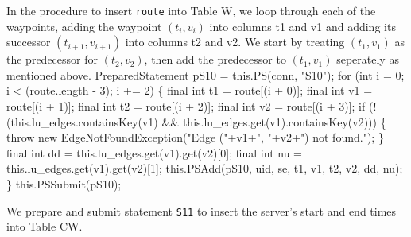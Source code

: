 \documentclass{article}
\def\nwendcode{\endtrivlist \endgroup}      %
\let\nwdocspar=\par
\theoremstyle{definition}                   %
\begin{document}
\nwendcode{}\nwdocspar
{\small In the procedure to insert {\tt{}route} into Table W, we loop through each
of the waypoints, adding the waypoint $(t_i,v_i)$ into columns \textsf{t1} and
\textsf{v1} and adding its successor $(t_{i+1},v_{i+1})$ into columns
\textsf{t2} and \textsf{v2}. We start by treating $(t_1,v_1)$ as the
predecessor for $(t_2,v_2)$, then add the predecessor to $(t_1,v_1)$ seperately
as mentioned above.}
\nwenddocs{}\endmoddef{}
PreparedStatement pS10 = this.PS(conn, "S10");
for (int i = 0; i < (route.length - 3); i += 2) \{
  final int t1 = route[(i + 0)];
  final int v1 = route[(i + 1)];
  final int t2 = route[(i + 2)];
  final int v2 = route[(i + 3)];
  if (!(this.lu_edges.containsKey(v1) && this.lu_edges.get(v1).containsKey(v2))) \{
    throw new EdgeNotFoundException("Edge ("+v1+", "+v2+") not found.");
  \}
  final int dd = this.lu_edges.get(v1).get(v2)[0];
  final int nu = this.lu_edges.get(v1).get(v2)[1];
  this.PSAdd(pS10, uid, se, t1, v1, t2, v2, dd, nu);
\}
this.PSSubmit(pS10);
\nwendcode{}\nwdocspar
{\small We prepare and submit statement {\tt{}\protect{}S11} to insert the server's
start and end times into Table CW.}
\nwenddocs{}\endmoddef{}
\end{document}
